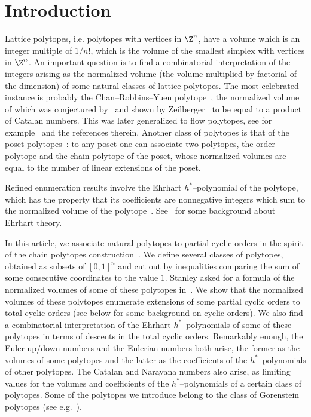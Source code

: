 \section{Introduction}\label{sec:introduction}

Lattice polytopes, i.e. polytopes with vertices in $\Z^n$, have a volume which is an integer multiple of $1/n!$, which is the volume of the smallest simplex with vertices in $\Z^n$. An important question is to find a combinatorial interpretation of the integers arising as the normalized volume (the volume multiplied by factorial of the dimension) of some natural classes of lattice polytopes. The most celebrated instance is probably the Chan--Robbins--Yuen polytope~\cite{CRY00}, the normalized volume of which was conjectured by~\cite{CRY00} and shown by Zeilberger~\cite{Z99} to be equal to a product of Catalan numbers. This was later generalized to flow polytopes, see for example~\cite{CKM17} and the references therein. Another class of polytopes is that of the poset polytopes~\cite{S86}: to any poset one can associate two polytopes, the order polytope and the chain polytope of the poset, whose normalized volumes are equal to the number of linear extensions of the poset.

Refined enumeration results involve the Ehrhart $h^*$--polynomial of the polytope, which has the property that its coefficients are nonnegative integers which sum to the normalized volume of the polytope~\cite{S80}. See~\cite{BR15} for some background about Ehrhart theory.

In this article, we associate natural polytopes to partial cyclic orders in the spirit of the chain polytopes construction~\cite{S86}. We define several classes of polytopes, obtained as subsets of $[0,1]^n$ and cut out by inequalities comparing the sum of some consecutive coordinates to the value $1$. Stanley asked for a formula of the normalized volumes of some of these polytopes in~\cite[Exercise~4.56$\MK$(d)]{S12}. We show that the normalized volumes of these polytopes enumerate extensions of some partial cyclic orders to total cyclic orders (see below for some background on cyclic orders). We also find a combinatorial interpretation of the Ehrhart $h^*$--polynomials of some of these polytopes in terms of descents in the total cyclic orders. Remarkably enough, the Euler up/down numbers and the Eulerian numbers both arise, the former as the volumes of some polytopes and the latter as the coefficients of the $h^*$--polynomials of other polytopes. The Catalan and Narayana numbers also arise, as limiting values for the volumes and coefficients of the $h^*$--polynomials of a certain class of polytopes. Some of the polytopes we introduce belong to the class of Gorenstein polytopes (see e.g.~\cite{BN08}).


